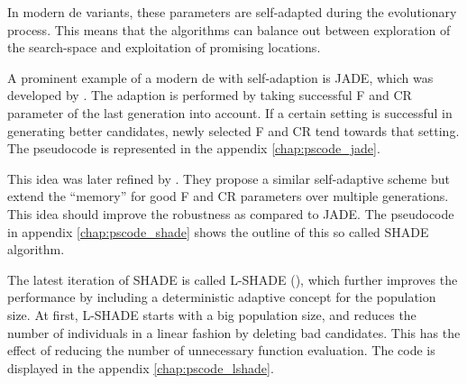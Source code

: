 \documentclass[./\jobname.tex]{subfiles}
\begin{document}
In modern \gls{de} variants, these parameters are self-adapted during the evolutionary process. This means that the algorithms can balance out between exploration of the search-space and exploitation of promising locations. 

A prominent example of a modern \gls{de} with self-adaption is JADE, which was developed by \cite{zhang_jade_2009}. The adaption is performed by taking successful F and CR parameter of the last generation into account. If a certain setting is successful in generating better candidates, newly selected F and CR tend towards that setting. The pseudocode is represented in the appendix \ref{chap:pscode_jade}. 

This idea was later refined by \cite{tanabe_success-history_2013}. They propose a similar self-adaptive scheme but extend the ``memory'' for good F and CR parameters over multiple generations. This idea should improve the robustness as compared to JADE. The pseudocode in appendix \ref{chap:pscode_shade} shows the outline of this so called SHADE algorithm. 

The latest iteration of SHADE is called L-SHADE (\cite{tanabe_improving_2014}), which further improves the performance by including a deterministic adaptive concept for the population size. At first, L-SHADE starts with a big population size, and reduces the number of individuals in a linear fashion by deleting bad candidates. This has the effect of reducing the number of unnecessary function evaluation. The code is displayed in the appendix \ref{chap:pscode_lshade}. 
\end{document}
